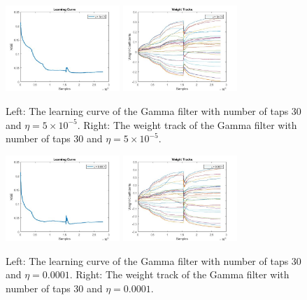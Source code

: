 \documentclass[conference]{IEEEtran}
\begin{document}
	\begin{figure}[htbp]
	\centering
	\includegraphics[width = 1.7in]{Gamma_LC_eta4_mu15_M30.jpg}
	\includegraphics[width=1.7in]{Gamma_WT_eta2_mu15_M30.jpg}
	\caption{Left: The learning curve of the Gamma filter with number of taps 30 and  $\eta = 5\times 10^{-5}$. Right: The weight track of the Gamma filter with number of taps 30 and  $\eta =5\times 10^{-5}$.}
	\label{gammaLCWT2}
	\end{figure}


	\begin{figure}[htbp]
	\centering
	\includegraphics[width = 1.7in]{Gamma_LC_eta3_mu15_M30.jpg}
	\includegraphics[width=1.7in]{Gamma_WT_eta3_mu15_M30.jpg}
	\caption{Left: The learning curve of the Gamma filter with number of taps 30 and  $\eta = 0.0001$. Right: The weight track of the Gamma filter with number of taps 30 and  $\eta = 0.0001$.}
	\label{gammaLCWT3}
	\end{figure}
\end{document}
